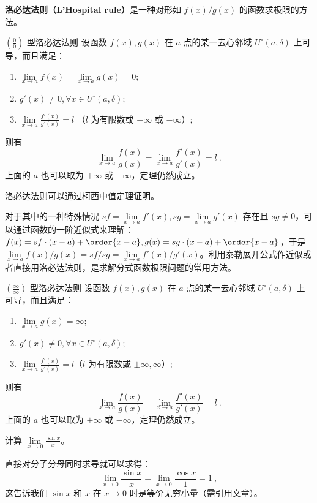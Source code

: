 

\textbf{洛必达法则（L'Hospital rule）}是一种对形如 $f(x)/g(x)$ 的函数求极限的方法。


\begin{theorem}{$\left(\frac{0}{0}\right)$ 型洛必达法则}
设函数 $f(x),g(x)$ 在 $a$ 点的某一去心邻域 $U^\circ(a,\delta)$ 上可导，而且满足：
\begin{enumerate}
\item $\lim\limits_{x\rightarrow a} f(x)=\lim\limits_{x\rightarrow a}g(x)=0$;
\item $g'(x)\neq 0, \forall x\in U^\circ(a,\delta)$;
\item $\displaystyle\lim\limits_{x\rightarrow a} \frac{f'(x)}{g'(x)}=l$ （$l$ 为有限数或 $+\infty$ 或 $-\infty$）;
\end{enumerate}
则有
\begin{equation}
\lim\limits_{x\rightarrow a}\frac{f(x)}{g(x)}=\lim\limits_{x\rightarrow a}\frac{f'(x)}{g'(x)}=l~.
\end{equation}
上面的 $a$ 也可以取为 $+\infty$ 或 $-\infty$，定理仍然成立。
\end{theorem}
洛必达法则可以通过柯西中值定理证明。

对于其中的一种特殊情况 $sf=\lim\limits_{x\rightarrow a}f'(x),sg=\lim\limits_{x\rightarrow a}g'(x)$ 存在且 $sg\neq 0$，可以通过函数的一阶近似式来理解：$f(x)=sf\cdot (x-a)+\order{x-a},g(x)=sg\cdot (x-a)+\order{x-a}$，于是 $\lim\limits_{x\rightarrow a}f(x)/g(x)=sf/sg=\lim\limits_{x\rightarrow a}f'(x)/g'(x)$。利用泰勒展开公式作近似或者直接用洛必达法则，是求解分式函数极限问题的常用方法。

\begin{theorem}{$\left(\frac{\infty}{\infty}\right)$ 型洛必达法则}
设函数 $f(x),g(x)$ 在 $a$ 点的某一去心邻域 $U^\circ(a,\delta)$ 上可导，而且满足：
\begin{enumerate}
\item $\lim\limits_{x\rightarrow a} g(x)=\infty$;
\item $g'(x)\neq 0,\forall x\in U^\circ(a,\delta)$;
\item $\lim\limits_{x\rightarrow a} \frac{f'(x)}{g'(x)}=l$（$l$ 为有限数或 $\pm\infty,\infty$）;
\end{enumerate}
则有
\begin{equation}
\lim\limits_{x\rightarrow a}\frac{f(x)}{g(x)}=\lim\limits_{x\rightarrow a}\frac{f'(x)}{g'(x)}=l~.
\end{equation}
上面的 $a$ 也可以取为 $+\infty$ 或 $-\infty$，定理仍然成立。
\end{theorem}
\begin{exercise}{}
计算 $\lim\limits_{x\rightarrow 0}\frac{\sin x}{x}$。
\end{exercise}
直接对分子分母同时求导就可以求得：
\begin{equation}
    \lim\limits_{x\rightarrow 0}\frac{\sin x}{x}=\lim\limits_{x\rightarrow 0}\frac{\cos x}{1}=1~,
\end{equation}
这告诉我们 $\sin x$ 和 $x$ 在 $x\rightarrow 0$ 时是等价无穷小量（需引用文章）。

